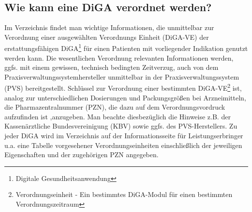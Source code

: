 \subsection{Wie kann eine DiGA verordnet werden?}
Im Verzeichnis findet man wichtige Informationen, die unmittelbar zur Verordnung einer ausgewählten Verordnungs Einheit (DiGA-VE) der erstattungsfähigen DiGA\footnote{Digitale Gesundheitsanwendung} für einen Patienten mit vorliegender Indikation genutzt werden kann.
Die wesentlichen Verordnung relevanten Informationen werden, ggfs. mit einem gewissen, technisch bedingten Zeitverzug, auch von dem Praxisverwaltungssystemhersteller unmittelbar in der Praxisverwaltungssystem (PVS) bereitgestellt.
Schlüssel zur Verordnung einer bestimmten DiGA-VE\footnote{Verordnungseinheit - Ein bestimmtes DiGA-Modul für einen bestimmten Verordnungszeitraum} ist, analog zur unterschiedlichen Dosierungen und Packungsgrößen bei Arzneimitteln, die Pharmazentralnummer (PZN), die dazu auf dem Verordnungsvordruck aufzufinden ist ,anzugeben. Man beachte diesbezüglich die Hinweise z.B. der Kassenärztliche Bundesvereinigung (KBV) sowie ggfs. des PVS-Herstellers.
Zu jeder DiGA wird im Verzeichnis auf der Informationsseite für Leistungserbringer u.a. eine Tabelle vorgesehener Verordnungseinheiten einschließlich der jeweiligen Eigenschaften und der zugehörigen PZN angegeben.

